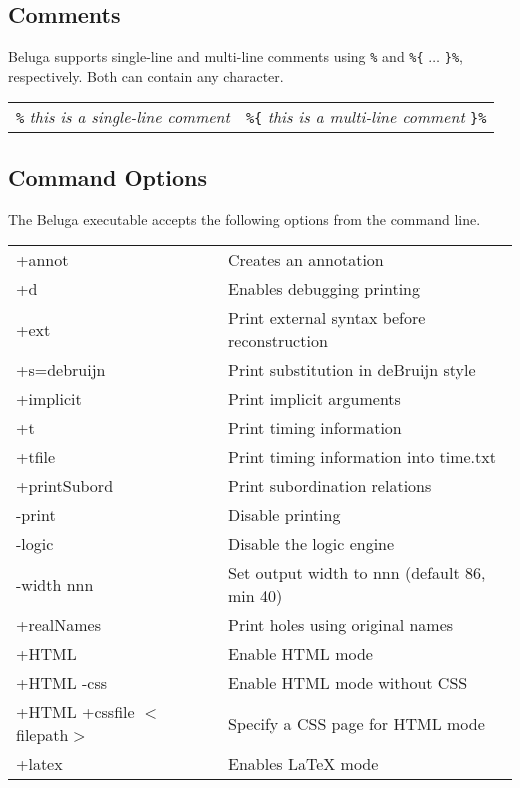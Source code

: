 \documentclass[11pt]{article}
\begin{document}
\subsection{Comments}
Beluga supports single-line and multi-line comments using \texttt{\%} and \texttt{\%\{} $\ldots$ \texttt{\}\%}, respectively. Both can contain any character.
\begin{center}
\begin{tabular}{ | l | r }
  \texttt{\%} \textit{this is a single-line comment} &  \texttt{\%\{} \textit{this is a multi-line comment}  \texttt{\}\%} \\
\end{tabular}
\end{center}


\subsection{Command Options}
The Beluga executable accepts the following options from the command line.\\

\begin{tabular}{ | l l }
+annot & Creates an annotation\\
+d & Enables debugging printing \\ 
+ext &  Print external syntax before reconstruction \\
+s=debruijn & Print substitution in deBruijn style \\
+implicit & Print implicit arguments \\
+t & Print timing information \\
+tfile & Print timing information into time.txt \\
+printSubord & Print subordination relations \\
-print & Disable printing \\
-logic & Disable the logic engine \\
-width nnn & Set output width to nnn (default 86, min 40) \\
+realNames & Print holes using original names\\
+HTML & Enable HTML mode\\
+HTML -css & Enable HTML mode without CSS\\
+HTML +cssfile $<$filepath$>$ & Specify a CSS page for HTML mode\\
+latex & Enables LaTeX mode\\ 
\end{tabular}
\end{document}
